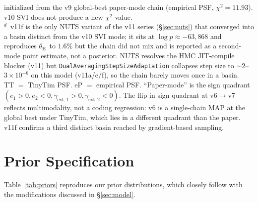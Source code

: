 \documentclass[11pt,letterpaper]{article}
\newcommand{\thetaE}{\ensuremath{\theta_{\mathrm{E}}}}
\newcommand{\gextone}{\ensuremath{\gamma_{\mathrm{ext},1}}}
\newcommand{\gexttwo}{\ensuremath{\gamma_{\mathrm{ext},2}}}
\newcommand{\eone}{\ensuremath{e_{1}}}
\newcommand{\etwo}{\ensuremath{e_{2}}}
\begin{document}
\begin{table}[ht]
{initialized from the v9 global-best paper-mode chain (empirical PSF,
$\chi^{2}=11.93$). v10 SVI does not produce a new $\chi^{2}$ value.\\
$^{d}$~v11f is the only NUTS variant of the v11 series
(\S\ref{sec:nuts}) that converged into a basin distinct from the v10
SVI mode; it sits at $\log p \approx -63{,}868$ and reproduces \thetaE\
to $1.6\%$ but the chain did not mix and is reported as a second-mode
point estimate, not a posterior. NUTS resolves the HMC JIT-compile
blocker (v11) but \texttt{DualAveragingStepSizeAdaptation} collapses
step size to $\sim 2$--$3\times 10^{-6}$ on this model (v11a/e/f), so
the chain barely moves once in a basin.\\
TT $=$ TinyTim PSF. eP $=$ empirical PSF. ``Paper-mode'' is the sign
quadrant $(\eone{>}0,\etwo{<}0,\gextone{>}0,\gexttwo{<}0)$. The flip in
sign quadrant at v6$\to$v7 reflects multimodality, not a coding
regression: v6 is a single-chain MAP at the global best under TinyTim,
which lies in a different quadrant than the paper. v11f confirms a
third distinct basin reached by gradient-based sampling.}
\end{table}

\section{Prior Specification}
\label{app:priors}

Table~\ref{tab:priors} reproduces our prior distributions, which
closely follow \citet[][Table 2]{huang2025foundry1} with the
modifications discussed in \S\ref{sec:model}.
\end{document}
